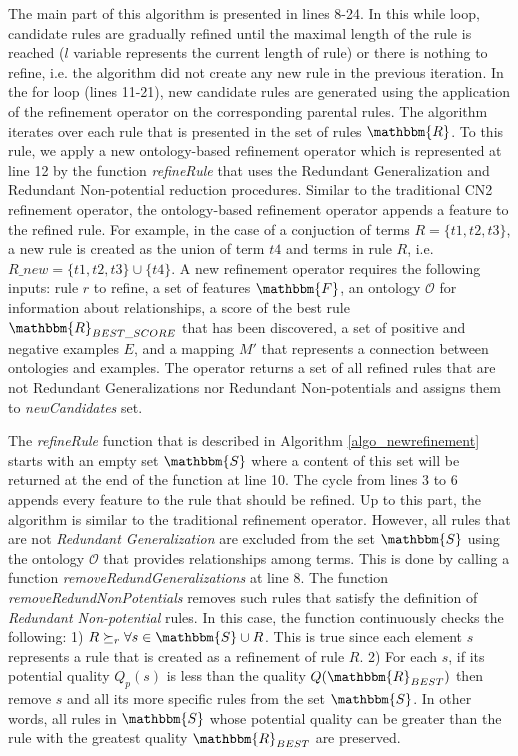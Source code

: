 \documentclass{bmcart}
\begin{document}
The main part of this algorithm is presented in lines 8-24. In this while loop, candidate rules are gradually refined until the maximal length of the rule is reached ($l$ variable represents the current length of rule) or there is nothing to refine, i.e. the algorithm did not create any new rule in the previous iteration. In the for loop (lines 11-21), new candidate rules are generated using the application of the refinement operator on the corresponding parental rules. The algorithm iterates over each rule that is presented in the set of rules $\mathbbm{R}$. To this rule, we apply a new ontology-based refinement operator which is represented at line 12 by the function \textit{refineRule} that uses the Redundant Generalization and Redundant Non-potential reduction procedures.
Similar to the traditional CN2 refinement operator, the ontology-based refinement operator appends a feature to the refined rule. For example, in the case of a conjuction of terms $R = \{t1, t2, t3\}$, a new rule is created as the union of term $t4$ and terms in rule $R$, i.e. $R\_new = \{t1, t2, t3\} \cup \{t4\}$.
A new refinement operator requires the following inputs: rule $r$ to refine, a set of features $\mathbbm{F}$, an ontology $\mathcal{O}$ for information about relationships, a score of the best rule $\mathbbm{R}_{BEST\_SCORE}$ that has been discovered, a set of positive and negative examples $E$, and a mapping $M'$ that represents a connection between ontologies and examples. The operator returns a set of all refined rules that are not Redundant Generalizations nor Redundant Non-potentials and assigns them to \textit{newCandidates} set.

The \emph{refineRule} function that is described in Algorithm \ref{algo_newrefinement} starts with an empty set $\mathbbm{S}$ where a content of this set will be returned at the end of the function at line 10. The cycle from lines 3 to 6 appends every feature to the rule that should be refined. Up to this part, the algorithm is similar to the traditional refinement operator. However, all rules that are not \emph{Redundant Generalization} are excluded from the set $\mathbbm{S}$ using the ontology $\mathcal{O}$ that provides relationships among terms. This is done by calling a function \emph{removeRedundGeneralizations} at line 8. The function \emph{removeRedundNonPotentials} removes such rules that satisfy the definition of \emph{Redundant Non-potential} rules. In this case, the function continuously checks the following: 1) $R \succeq_{r} \forall s \in \mathbbm{S} \cup R$. This is true since each element $s$ represents a rule that is created as a refinement of rule $R$. 2) For each $s$, if its potential quality $Q_p(s)$ is less than the quality $Q(\mathbbm{R}_{BEST})$ then remove $s$ and all its more specific rules from the set $\mathbbm{S}$. In other words, all rules in $\mathbbm{S}$ whose potential quality can be greater than the rule with the greatest quality $\mathbbm{R}_{BEST}$ are preserved.
\end{document}
